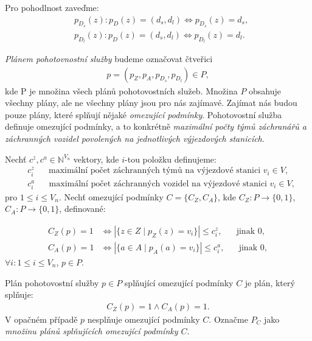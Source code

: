 Pro pohodlnost zaveďme:
\begin{align*}
  & p_{D_s}(z) \colon p_D(z) = (d_s, d_l) \Leftrightarrow p_{D_s}(z) = d_s, \\
  & p_{D_l}(z) \colon  p_D(z) = (d_s, d_l) \Leftrightarrow p_{D_l}(z) = d_l.
\end{align*}

\textit{Plánem pohotovnostní služby} budeme označovat 
čtveřici
\begin{align*}
  p = (p_Z, p_A, p_{D_{s}}, p_{D_{l}}) \in P,
\end{align*}
kde P je množina všech plánů pohotovostních služeb.
Množina $P$ obsahuje všechny plány, ale ne všechny plány jsou pro nás zajímavé.
Zajímat nás budou pouze plány, které splňují nějaké \textit{omezující podmínky}.
Pohotovostní služba definuje omezující podmínky, a to konkrétně \textit{maximální počty týmů záchranářů a záchranných vozidel povolených na jednotlivých výjezdových stanicích}.
\begin{definice}
  Nechť $c^z, c^a \in \mathbb{N}^{V_n}$ vektory, 
  kde $i$-tou položku definujeme:
  \begin{align*}
    &c^z_i \hspace{20pt} \text{maximální počet záchranných týmů na výjezdové stanici $v_i \in V$}, \\ 
    &c^a_i \hspace{20pt} \text{maximální počet záchranných vozidel na výjezdové stanici $v_i \in V$},
  \end{align*}
  pro $1 \leq i \leq V_n$.
  Nechť omezující podmínky $C = \{ C_Z, C_A \}$, kde $C_Z \colon P \rightarrow \{ 0, 1 \}$, $C_A \colon P \rightarrow \{ 0, 1 \}$, definované:

  \begin{align*}
    C_Z(p) = 1 &\iff |\{ z \in Z \mid p_Z(z) = v_i \}| \leq c^z_i, \hspace{20pt} \text{jinak 0}, \\
    C_A(p) = 1 &\iff |\{ a \in A \mid p_A(a) = v_i \}| \leq c^a_i, \hspace{20pt} \text{jinak 0},
  \end{align*}
  $\forall i \colon 1 \leq i \leq V_n$, $p \in P$.
\end{definice}

Plán pohotovostní služby $p \in P$ splňující omezující podmínky $C$ je plán, který splňuje:
\begin{align*}
    C_Z(p) = 1 \land C_A(p) = 1.
\end{align*}
V opačném případě $p$ nesplňuje omezující podmínky $C$.
Označme $P_C$ jako \textit{množinu plánů splňujících omezující podmínky $C$}.

